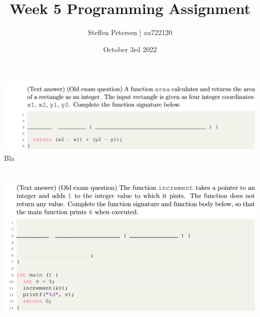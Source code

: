 \documentclass{article}
\title{Week 5 Programming Assignment}
\author{Steffen Petersen | au722120}
\date{October 3rd 2022}
\begin{document}


\maketitle
\section{}
\includegraphics[width=\linewidth, keepaspectratio=true]{task1}
\vspace{2pt}\\
Bla


\section{}
\includegraphics[width=\linewidth, keepaspectratio=true]{task2}
\vspace{2pt}\\
\end{document}
